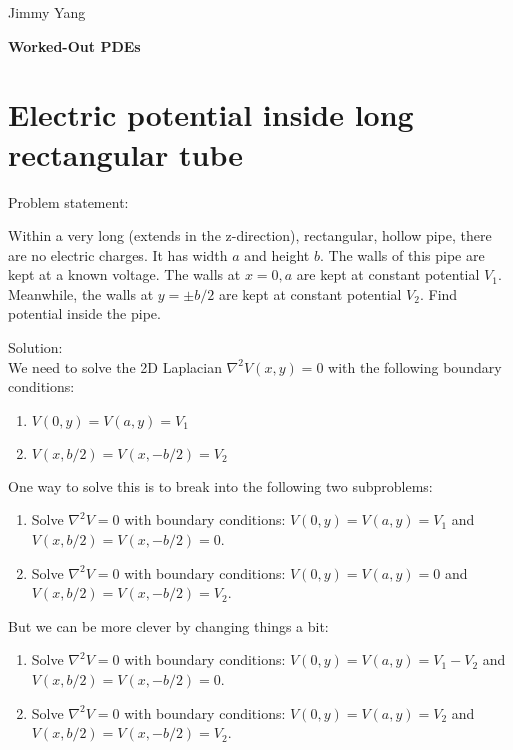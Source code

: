 \documentclass[12pt, a4paper]{article}
\newcommand{\doctitle}{Worked-Out PDEs}
\newcommand{\name}{Jimmy Yang}
\begin{document}
\begin{flushright}
\name
\end{flushright}

\begin{center}
\Large
\bfseries
\doctitle
\end{center}

\section{Electric potential inside long rectangular tube}

Problem statement:

\begin{displayquote}
Within a very long (extends in the z-direction), rectangular, hollow pipe, there are no electric charges. It has width $a$ and height $b$. The walls of this pipe are kept at a known voltage. The walls at $x=0,a$ are kept at constant potential $V_1$. Meanwhile, the walls at $y=\pm b/2$ are kept at constant potential $V_2$. Find potential inside the pipe.
\end{displayquote}

Solution: \\

We need to solve the 2D Laplacian $\nabla^2 V (x, y)=0$ with the following boundary conditions:

\begin{enumerate}[i]
  \item $V(0,y)=V(a,y)=V_1$
  \item $V(x,b/2)=V(x,-b/2)=V_2$
\end{enumerate}

One way to solve this is to break into the following two subproblems:

\begin{enumerate}
  \item Solve $\nabla^2 V=0$ with boundary conditions: $V(0,y)=V(a,y)=V_1$ and $V(x,b/2)=V(x,-b/2)=0$.
  \item Solve $\nabla^2 V=0$ with boundary conditions: $V(0,y)=V(a,y)=0$ and $V(x,b/2)=V(x,-b/2)=V_2$.
\end{enumerate}

But we can be more clever by changing things a bit:

\begin{enumerate}
  \item Solve $\nabla^2 V=0$ with boundary conditions: $V(0,y)=V(a,y)=V_1-V_2$ and $V(x,b/2)=V(x,-b/2)=0$.
  \item Solve $\nabla^2 V=0$ with boundary conditions: $V(0,y)=V(a,y)=V_2$ and $V(x,b/2)=V(x,-b/2)=V_2$.
\end{enumerate}
\end{document}
